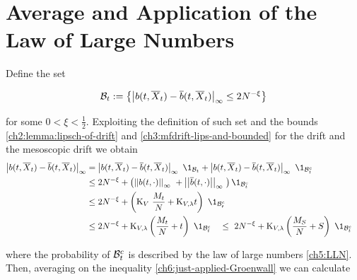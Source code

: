 \section{Average and Application of the Law of Large Numbers}\label{ch6:2nd-part-of-the-proof}

Define the set

\begin{equation*}
	\mathcal{B}_t := \left\{
		\left| b(t, \overline{X}_t) - \overline{b}(t, \overline{X}_t) \right|_\infty \leq 2N^{-\xi}
	\right\}
\end{equation*}

for some $0 < \xi < \frac{1}{2}$.
Exploiting the definition of such set and the bounds \ref{ch2:lemma:lipsch-of-drift} and \ref{ch3:mfdrift-lips-and-bounded} for the drift and the mesoscopic drift we obtain
\begin{align*}
	\norm{\drift(t, \mfsol_t) - \mfdrift(t, \mfsol_t)}_\infty 
	&=
		\norm{\drift(t, \mfsol_t) - \mfdrift(t, \mfsol_t)}_\infty\
		\1_{\setB_t
		}
		+
		\norm{\drift(t, \mfsol_t) - \mfdrift(t, \mfsol_t)}_\infty\
		\1_{\setB_t^c
		}
		\\
		&\leq
			2N^{-\xi}
			+
			\left(
				\Norm{\drift(t, \cdot)}_\infty\
				+
				\Norm{\mfdrift(t, \cdot)}_\infty\
			\right)
			\1_{\setB_t^c}
		\\
		&\leq
		2N^{-\xi}
		+
		\left(
			\const_{\attraction}\
			\frac{\hmactive_t}{N}
			+
			\const_{\attraction, \lambda} t
		\right)\
		\1_{\setB_t^c}
		\\
		&\leq
		2N^{-\xi}
		+
		\const_{\attraction, \lambda} 
		\left(
		\frac{\hmactive_t}{N}
		+
		t
		\right)\
		\1_{\setB_t^c}\quad
		\leq\
		2N^{-\xi}
		+
		\const_{\attraction, \lambda} 
		\left(
		\frac{\hmactive_S}{N}
		+
		S
		\right)\
		\1_{\setB_t^c}\quad
\end{align*}

where the probability of $\mathcal{B}_t^c$ is described by the law of large numbers \ref{ch5:LLN}.
Then, averaging on the inequality \ref{ch6:just-applied-Groenwall} we can calculate

